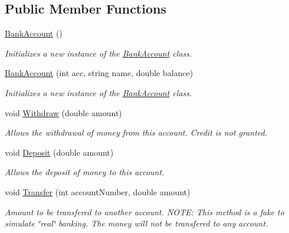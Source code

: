 \subsection*{Public Member Functions}
\begin{DoxyCompactItemize}
\item 
\hyperlink{class_application_logic_1_1_model_1_1_bank_account_a5b8a8d5016479300dbd5e43919934dc8}{BankAccount} ()
\begin{DoxyCompactList}\small\item\em Initializes a new instance of the \hyperlink{class_application_logic_1_1_model_1_1_bank_account}{BankAccount} class. \item\end{DoxyCompactList}\item 
\hyperlink{class_application_logic_1_1_model_1_1_bank_account_aba62cffcc8519b91570084bd434d6b1f}{BankAccount} (int acc, string name, double balance)
\begin{DoxyCompactList}\small\item\em Initializes a new instance of the \hyperlink{class_application_logic_1_1_model_1_1_bank_account}{BankAccount} class. \item\end{DoxyCompactList}\item 
void \hyperlink{class_application_logic_1_1_model_1_1_bank_account_ac6480abe0603a7af0dce1542de3bae35}{Withdraw} (double amount)
\begin{DoxyCompactList}\small\item\em Allows the withdrawal of money from this account. Credit is not granted. \item\end{DoxyCompactList}\item 
void \hyperlink{class_application_logic_1_1_model_1_1_bank_account_abd5fc472bccff591d953f2419f41ea32}{Deposit} (double amount)
\begin{DoxyCompactList}\small\item\em Allows the deposit of money to this account. \item\end{DoxyCompactList}\item 
void \hyperlink{class_application_logic_1_1_model_1_1_bank_account_a13c11e07681efcee17b4f7b234087144}{Transfer} (int accountNumber, double amount)
\begin{DoxyCompactList}\small\item\em Amount to be transfered to another account. NOTE: This method is a fake to simulate \char`\"{}real\char`\"{} banking. The money will not be transfered to any account. \item\end{DoxyCompactList}\item 

\end{DoxyCompactItemize}
